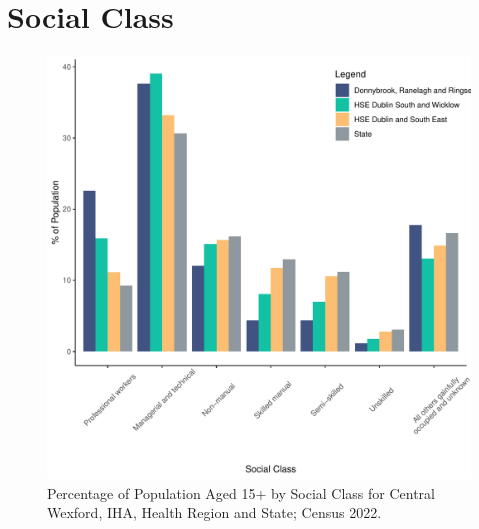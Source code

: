 \documentclass{article}
\begin{document}
\section{Social Class}\label{sect:SC}
\begin{figure}[H]
	\centering
	\includegraphics[width = 140mm]{../figures/SocialClassED.pdf}
	\caption{Percentage of Population Aged 15+ by Social Class for Central Wexford, IHA, Health Region and State; Census 2022.}
	\label{fig:vbnv}
	\end{figure}
\end{document}
